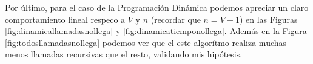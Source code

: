 \par Por \'ultimo, para el caso de la Programaci\'on Din\'amica podemos apreciar un claro comportamiento lineal
respeco a $V$ y $n$ (recordar que $n = V-1$) en las Figuras \ref{fig:dinamicallamadasnollega} y 
\ref{fig:dinamicatiemponollega}. Adem\'as en la Figura \ref{fig:todosllamadasnollega} podemos ver que
el este algor\'itmo realiza muchas menos llamadas recursivas que el resto, validando mis hip\'otesis.